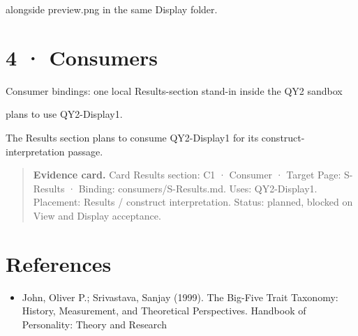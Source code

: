 \documentclass[11pt]{article}
\begin{document}
alongside preview.png in the same Display folder.

\section*{4 · Consumers}
Consumer bindings: one local Results-section stand-in inside the QY2 sandbox

plans to use QY2-Display1.

The Results section plans to consume QY2-Display1 for its construct-interpretation passage.

\begin{quote}\footnotesize\textbf{Evidence card.} Card Results section: C1 · Consumer · Target Page: S-Results · Binding: consumers/S-Results.md. Uses: QY2-Display1. Placement: Results / construct interpretation. Status: planned, blocked on View and Display acceptance.\end{quote}
\section{References}\begin{itemize}
\item John, Oliver P.; Srivastava, Sanjay (1999). The Big-Five Trait Taxonomy: History, Measurement, and Theoretical Perspectives. Handbook of Personality: Theory and Research
\end{itemize}
\end{document}
